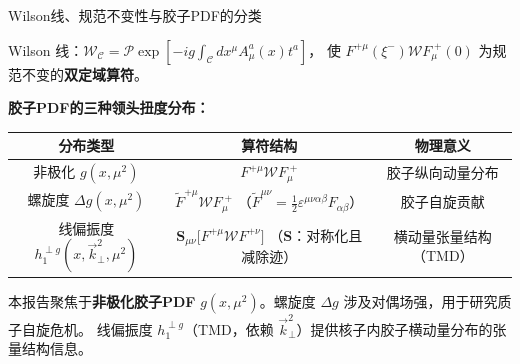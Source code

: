 \documentclass[10pt,aspectratio=169]{beamer}
\begin{document}
\begin{frame}{Wilson线、规范不变性与胶子PDF的分类}

  Wilson 线：$\mathcal{W}_{\mathcal{C}} = \mathcal{P}\exp[-ig \int_{\mathcal{C}} dx^\mu A_\mu^a(x) t^a]$，
  使 $F^{+\mu}(\xi^{-}) \mathcal{W} F_{\mu}^{\;+}(0)$ 为规范不变的\textbf{双定域算符}。

  \textbf{胶子PDF的三种领头扭度分布：}
  \begin{center}
  \begin{tabular}{c|c|c}
    \hline
    \textbf{分布类型} & \textbf{算符结构} & \textbf{物理意义} \\
    \hline
    非极化 $g(x,\mu^2)$ &
    $F^{+\mu}\mathcal{W} F_{\mu}^{\;+}$ &
    胶子纵向动量分布 \\
    \hline
    螺旋度 $\Delta g(x,\mu^2)$ &
    $\tilde{F}^{+\mu}\mathcal{W} F_{\mu}^{\;+}$
    （$\tilde{F}^{\mu\nu} = \frac{1}{2}\varepsilon^{\mu\nu\alpha\beta}F_{\alpha\beta}$） &
    胶子自旋贡献 \\
    \hline
    线偏振度 $h_{1}^{\perp g}(x,\vec{k}_\perp^2,\mu^2)$ &
    $\mathbf{S}_{\mu\nu}\!\big[F^{+\mu}\mathcal{W}F^{+\nu}\big]$\quad%
    {\tiny（$\mathbf{S}$：对称化且减除迹）} &
    横动量张量结构（TMD） \\
    \hline
  \end{tabular}
  \end{center}

  本报告聚焦于\textbf{非极化胶子PDF} $g(x,\mu^2)$。螺旋度 $\Delta g$ 涉及对偶场强，用于研究质子自旋危机。
  线偏振度 $h_{1}^{\perp g}$（TMD，依赖 $\vec{k}_\perp^2$）提供核子内胶子横动量分布的张量结构信息。
\end{frame}
\end{document}
